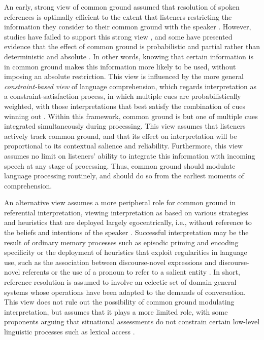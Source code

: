 \documentclass[doc,fignum,apacite,floatsintext]{apa6}
\begin{document}
An early, strong view of common ground assumed that resolution of spoken references is optimally efficient to the extent that listeners restricting the information they consider to their common ground with the speaker \cite{clarkcarlson81}.  However, studies have failed to support this strong view \cite{keysaretal00}, and some have presented evidence that the effect of common ground is probabilistic and partial rather than deterministic and absolute \cite{hannaetal03,nadigsedivy02}.  In other words, knowing that certain information is in common ground makes this information more likely to be used, without imposing an absolute restriction.  This view is influenced by the more general \textit{constraint-based view} of language comprehension, which regards interpretation as a constraint-satisfaction process, in which multiple cues are probabilistically weighted, with those interpretations that best satisfy the combination of cues winning out \cite{macdonaldetal94,tanenhaustrueswell95}.  Within this framework, common ground is but one of multiple cues integrated simultaneously during processing.  This view assumes that listeners actively track common ground, and that its effect on interpretation will be proportional to its contextual salience and reliability.  Furthermore, this view assumes no limit on listeners' ability to integrate this information with incoming speech at any stage of processing.  Thus, common ground should modulate language processing routinely, and should do so from the earliest moments of comprehension.

An alternative view assumes a more peripheral role for common ground in referential interpretation, viewing interpretation as based on various strategies and heuristics that are deployed largely egocentrically, i.e., without reference to the beliefs and intentions of the speaker \cite{keysaretal00,pickeringgarrod04}.  Successful interpretation may be the result of ordinary memory processes such as episodic priming and encoding specificity \cite{BarrJacksonPhillips2014,hortongerrig05a} or the deployment of heuristics that exploit regularities in language use, such as the association between discourse-novel expressions and discourse-novel referents \cite{kronmullerbarr07} or the use of a pronoun to refer to a salient entity \cite{FukumuraVanGompel2012}.  In short, reference resolution is assumed to involve an eclectic set of domain-general systems whose operations have been adapted to the demands of conversation.  This view does not rule out the possibility of common ground modulating interpretation, but assumes that it plays a more limited role, with some proponents arguing that situational assessments do not constrain certain low-level linguistic processes such as lexical access \cite{barr08b}.
\end{document}
